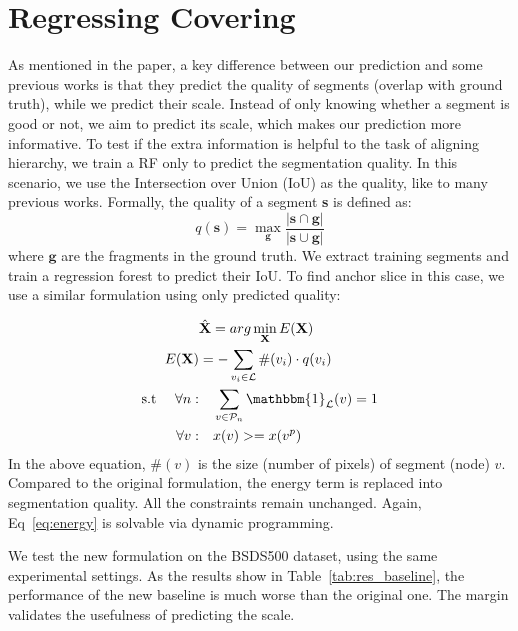 \section{Regressing Covering}
As mentioned in the paper, a key difference between our prediction and some previous
works is that they predict the quality of segments (overlap with ground truth), while we
predict their scale.
Instead of only knowing whether a segment is good or not, we aim to predict its scale,
which makes our prediction more informative.
To test if the extra information is helpful to the task of aligning hierarchy,
we train a RF only to predict the segmentation quality.
In this scenario, we use the Intersection over Union (IoU) as the quality, like to many previous works.
Formally, the quality of a segment \textbf{s} is defined as:
\begin{equation}
 q(\textbf{s}) = \max_{\textbf{g}}\frac{|\textbf{s}\cap\textbf{g}|}{|\textbf{s}\cup\textbf{g}|}
\end{equation}
where $\textbf{g}$ are the fragments in the ground truth.
We extract training segments and train a regression forest to predict their IoU.
To find anchor slice in this case, we use a similar formulation using only predicted quality:

\begin{equation}
  \label{eq:energy}
  \begin{split}
    &\hat{\mathbf{X}} = arg\min_{\mathbf{X}} E(\mathbf{X})\\
 E(\mathbf{X})& =  - \sum_{v_i \in \mathcal{L}} \#(v_i) \cdot q(v_i) \\
 \text{s.t   }  \quad \forall n: & \quad \sum_{v \in \mathcal{P}_n} \mathbbm{1}_\mathcal{L} (v) = 1\\
              \quad \forall v:  & \quad x(v) >= x(v^p)\\
   \end{split}
\end{equation}
In the above equation, $\#(v)$ is the size (number of pixels) of segment (node) $v$.
Compared to the original formulation, the energy term is replaced into segmentation quality.
All the constraints remain unchanged. Again, Eq~\ref{eq:energy} is solvable via dynamic programming.

We test the new formulation on the BSDS500 dataset, using the same experimental settings.
As the results show in Table~\ref{tab:res_baseline}, the performance of the new baseline is much worse
than the original one.
The margin validates the usefulness of predicting the scale.

